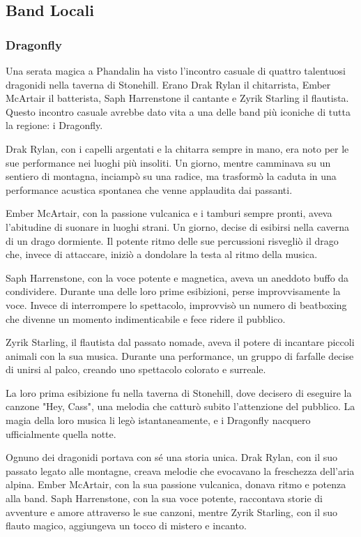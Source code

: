 \documentclass{article}
\begin{document}
\subsection{Band Locali}
\subsubsection{Dragonfly}
Una serata magica a Phandalin ha visto l'incontro casuale di quattro talentuosi dragonidi nella taverna di Stonehill. Erano Drak Rylan il chitarrista, Ember McArtair il batterista, Saph Harrenstone il cantante e Zyrik Starling il flautista. Questo incontro casuale avrebbe dato vita a una delle band più iconiche di tutta la regione: i Dragonfly.

Drak Rylan, con i capelli argentati e la chitarra sempre in mano, era noto per le sue performance nei luoghi più insoliti. Un giorno, mentre camminava su un sentiero di montagna, inciampò su una radice, ma trasformò la caduta in una performance acustica spontanea che venne applaudita dai passanti.

Ember McArtair, con la passione vulcanica e i tamburi sempre pronti, aveva l'abitudine di suonare in luoghi strani. Un giorno, decise di esibirsi nella caverna di un drago dormiente. Il potente ritmo delle sue percussioni risvegliò il drago che, invece di attaccare, iniziò a dondolare la testa al ritmo della musica.

Saph Harrenstone, con la voce potente e magnetica, aveva un aneddoto buffo da condividere. Durante una delle loro prime esibizioni, perse improvvisamente la voce. Invece di interrompere lo spettacolo, improvvisò un numero di beatboxing che divenne un momento indimenticabile e fece ridere il pubblico.

Zyrik Starling, il flautista dal passato nomade, aveva il potere di incantare piccoli animali con la sua musica. Durante una performance, un gruppo di farfalle decise di unirsi al palco, creando uno spettacolo colorato e surreale.

La loro prima esibizione fu nella taverna di Stonehill, dove decisero di eseguire la canzone "Hey, Cass", una melodia che catturò subito l'attenzione del pubblico. La magia della loro musica li legò istantaneamente, e i Dragonfly nacquero ufficialmente quella notte.

Ognuno dei dragonidi portava con sé una storia unica. Drak Rylan, con il suo passato legato alle montagne, creava melodie che evocavano la freschezza dell'aria alpina. Ember McArtair, con la sua passione vulcanica, donava ritmo e potenza alla band. Saph Harrenstone, con la sua voce potente, raccontava storie di avventure e amore attraverso le sue canzoni, mentre Zyrik Starling, con il suo flauto magico, aggiungeva un tocco di mistero e incanto.
\end{document}

